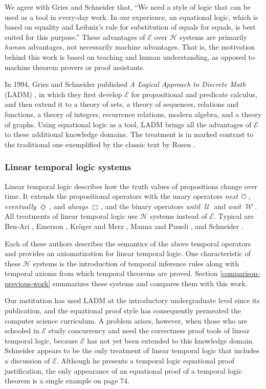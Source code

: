\documentclass[12pt, fleqn, leqno]{article}
\newcommand{\Until}{\;\mathcal{U}\;}
\newcommand{\Wait}{\;\mathcal{W}\;}
\newcommand{\Next}{\;\,\text{\raisebox{3.5pt}{\circle{6}}}}
\newcommand{\Event}{\Diamond\,}
\newcommand{\Always}{\Box\,}
\begin{document}
We agree with Gries and Schneider \cite{LADM} that, ``We need a style of logic that can be used as a tool in every-day work.
In our experience, an equational logic, which is based on equality and Leibniz's rule for substitution of equals for equals, is best suited for this purpose.''
These advantages of $\mathcal{E}$ over $\mathcal{H}$ systems are primarily \textit{human} advantages, not necessarily machine advantages.
That is, the motivation behind this work is based on teaching and human understanding, as opposed to machine theorem provers or proof assistants.

In 1994, Gries and Schneider published \textit{A Logical Approach to Discrete Math} (LADM) \cite{LADM}, in which they first develop $\mathcal{E}$ for propositional and predicate calculus, and then extend it to a theory of sets, a theory of sequences, relations and functions, a theory of integers, recurrence relations, modern algebra, and a theory of graphs.
Using equational logic as a tool, LADM brings all the advantages of $\mathcal{E}$ to these additional knowledge domains.
The treatment is in marked contrast to the traditional one exemplified by the classic text by Rosen \cite{Rosen}.

\subsubsection*{Linear temporal logic systems}

Linear temporal logic describes how the truth values of propositions change over time.
It extends the propositional operators with the unary operators \textit{next} $\Next$, \textit{eventually} $\Event$, and \textit{always} $\Always$, and the binary operators \textit{until} $\Until$ and \textit{wait} $\Wait$.
All treatments of linear temporal logic use $\mathcal{H}$ systems instead of $\mathcal{E}$.
Typical are Ben-Ari \cite{Ben2}, Emerson \cite{Emer}, Kröger and Merz \cite{Kroger}, Manna and Pnueli \cite{Manna}, and Schneider \cite{Schn}.

Each of these authors describes the semantics of the above temporal operators and provides an axiomatization for linear temporal logic.
One characteristic of these $\mathcal{H}$ systems is the introduction of temporal inference rules along with temporal axioms from which temporal theorems are proved.
Section \ref{comparison-previous-work} summarizes these systems and compares them with this work.

Our institution has used LADM at the introductory undergraduate level since its publication, and the equational proof style has consequently permeated the computer science curriculum.
A problem arises, however, when those who are schooled in $\mathcal{E}$ study concurrency and need the correctness proof tools of linear temporal logic, because $\mathcal{E}$ has not yet been extended to this knowledge domain.
Schneider \cite{Schn} appears to be the only treatment of linear temporal logic that includes a discussion of $\mathcal{E}$.
Although he presents a temporal logic equational proof justification, the only appearance of an equational proof of a temporal logic theorem is a single example on page 74.
\end{document}
